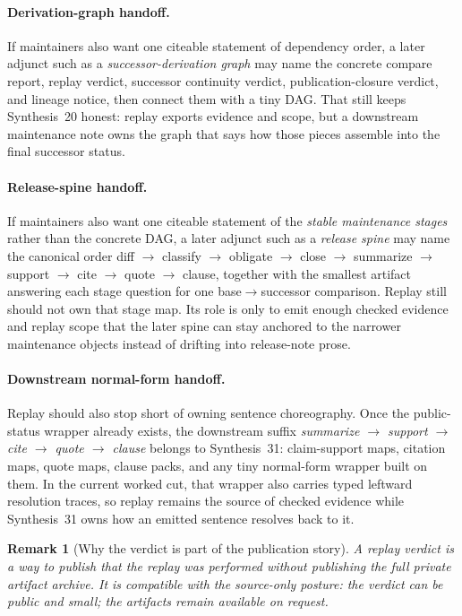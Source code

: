 \documentclass[11pt]{article}
\newtheorem{remark}{Remark}
\begin{document}
\paragraph{Derivation-graph handoff.}
If maintainers also want one citeable statement of dependency order, a later adjunct such as a \emph{successor-derivation graph} may name the concrete compare report, replay verdict, successor continuity verdict, publication-closure verdict, and lineage notice, then connect them with a tiny DAG. That still keeps Synthesis~20 honest: replay exports evidence and scope, but a downstream maintenance note owns the graph that says how those pieces assemble into the final successor status.\cite{series:workedexample,series:planstateequiv}


\paragraph{Release-spine handoff.}
If maintainers also want one citeable statement of the \emph{stable maintenance stages} rather than the concrete DAG, a later adjunct such as a \emph{release spine} may name the canonical order diff $\to$ classify $\to$ obligate $\to$ close $\to$ summarize $\to$ support $\to$ cite $\to$ quote $\to$ clause, together with the smallest artifact answering each stage question for one base$\to$successor comparison. Replay still should not own that stage map. Its role is only to emit enough checked evidence and replay scope that the later spine can stay anchored to the narrower maintenance objects instead of drifting into release-note prose.\cite{series:workedexample,series:planstateequiv}

\paragraph{Downstream normal-form handoff.}
Replay should also stop short of owning sentence choreography.
Once the public-status wrapper already exists, the downstream suffix
\emph{summarize $\to$ support $\to$ cite $\to$ quote $\to$ clause}
belongs to Synthesis~31: claim-support maps, citation maps, quote maps, clause packs, and any tiny normal-form wrapper built on them.
In the current worked cut, that wrapper also carries typed leftward resolution traces, so replay remains the source of checked evidence while Synthesis~31 owns how an emitted sentence resolves back to it.\cite{series:downstreamnormalforms,series:workedexample,series:planstateequiv}

\begin{remark}[Why the verdict is part of the publication story]
A replay verdict is a way to publish \emph{that the replay was performed} without publishing the full private artifact archive.
It is compatible with the source-only posture: the verdict can be public and small; the artifacts remain available on request.
\end{remark}
\end{document}
